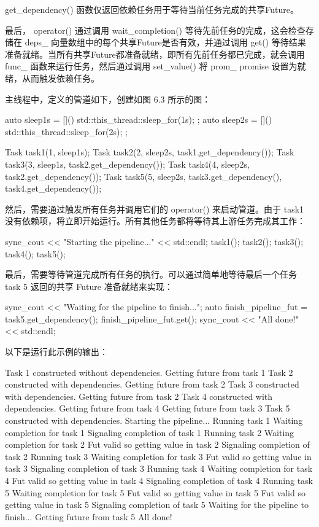 get\_dependency() 函数仅返回依赖任务用于等待当前任务完成的共享Future。

最后， operator() 通过调用 wait\_completion() 等待先前任务的完成，这会检查存储在 deps\_ 向量数组中的每个共享Future是否有效，并通过调用 get() 等待结果准备就绪。当所有共享Future都准备就绪，即所有先前任务都已完成，就会调用 func\_ 函数来运行任务，然后通过调用 set\_value() 将 prom\_ promise 设置为就绪，从而触发依赖任务。

主线程中，定义的管道如下，创建如图 6.3 所示的图：

\begin{cpp}
auto sleep1s = []() { std::this_thread::sleep_for(1s); };
auto sleep2s = []() { std::this_thread::sleep_for(2s); };

Task task1(1, sleep1s);
Task task2(2, sleep2s, task1.get_dependency());
Task task3(3, sleep1s, task2.get_dependency());
Task task4(4, sleep2s, task2.get_dependency());
Task task5(5, sleep2s, task3.get_dependency(),
                       task4.get_dependency());
\end{cpp}

然后，需要通过触发所有任务并调用它们的 operator() 来启动管道。由于 task1 没有依赖项，将立即开始运行。所有其他任务都将等待其上游任务完成其工作：

\begin{cpp}
sync_cout << "Starting the pipeline..." << std::endl;
task1();
task2();
task3();
task4();
task5();
\end{cpp}

最后，需要等待管道完成所有任务的执行。可以通过简单地等待最后一个任务 task 5 返回的共享 Future 准备就绪来实现：

\begin{cpp}
sync_cout << "Waiting for the pipeline to finish...\n";
auto finish_pipeline_fut = task5.get_dependency();
finish_pipeline_fut.get();
sync_cout << "All done!" << std::endl;
\end{cpp}

以下是运行此示例的输出：

\begin{shell}
Task 1 constructed without dependencies.
Getting future from task 1
Task 2 constructed with dependencies.
Getting future from task 2
Task 3 constructed with dependencies.
Getting future from task 2
Task 4 constructed with dependencies.
Getting future from task 4
Getting future from task 3
Task 5 constructed with dependencies.
Starting the pipeline...
Running task 1
Waiting completion for task 1
Signaling completion of task 1
Running task 2
Waiting completion for task 2
Fut valid so getting value in task 2
Signaling completion of task 2
Running task 3
Waiting completion for task 3
Fut valid so getting value in task 3
Signaling completion of task 3
Running task 4
Waiting completion for task 4
Fut valid so getting value in task 4
Signaling completion of task 4
Running task 5
Waiting completion for task 5
Fut valid so getting value in task 5
Fut valid so getting value in task 5
Signaling completion of task 5
Waiting for the pipeline to finish...
Getting future from task 5
All done!
\end{shell}

